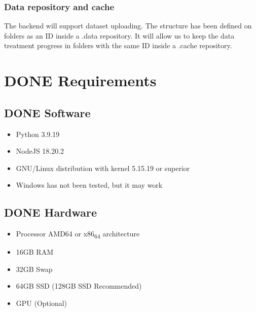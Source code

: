 \documentclass[a4paper]{article}
\begin{document}
\sffamily \footnotesize
\begin{center}

\end{center}
\rmfamily \normalsize

\subsubsection{Data repository and cache}
\label{sec:orgadea001}

The backend will support dataset uploading. The structure has been defined on folders as an ID inside a .data repository. It will allow us to keep the data treatment progress in folders with the same ID inside a .cache repository.

\section{{\bfseries\sffamily DONE} Requirements}
\label{sec:org7b7373f}

\subsection{{\bfseries\sffamily DONE} Software}
\label{sec:org925e975}

\begin{itemize}
\item Python 3.9.19

\item NodeJS 18.20.2

\item GNU/Linux distribution with kernel 5.15.19 or superior

\item Windows has not been tested, but it may work
\end{itemize}

\subsection{{\bfseries\sffamily DONE} Hardware}
\label{sec:orgebddfdb}

\begin{itemize}
\item Processor AMD64 or x86\textsubscript{64} architecture

\item 16GB RAM

\item 32GB Swap

\item 64GB SSD (128GB SSD Recommended)

\item GPU (Optional)
\end{itemize}
\end{document}

